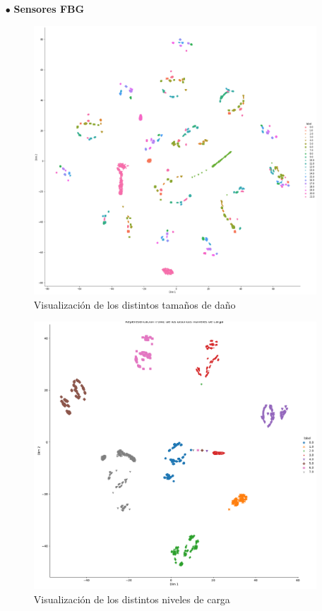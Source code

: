 \begin{itemize}
    \item[$\bullet$] \textbf{Sensores FBG}

    \begin{figure}[H]
        \centering
        \includegraphics[width=125mm]{3/Fotos/Ty_Si_INESASSE_t-sne.png}
        \captionsetup{justification=centering,margin=1.25cm}
        \caption{Visualización de los distintos tamaños de daño}
        \label{fig:tsne_FBG_Ty_Si}
    \end{figure}  
    
    \begin{figure}[H]
        \centering
        \includegraphics[width=125mm]{3/Fotos/tsne_Load_INESASSE.pdf}
        \captionsetup{justification=centering,margin=1.25cm}
        \caption{Visualización de los distintos niveles de carga}
        \label{fig:tsne_FBG_Load}
    \end{figure}  
    

\end{itemize}
